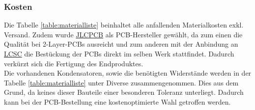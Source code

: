 \documentclass[12pt]{article}
\begin{document}
	\subsubsection{Kosten} \label{Kosten}
	Die Tabelle \ref{table:materialliste} beinhaltet alle anfallenden Materialkosten exkl. Versand. Zudem wurde \href{https://jlcpcb.com/}{JLCPCB} als PCB-Hersteller gewählt, da zum einen die Qualität bei 2-Layer-PCBs ausreicht und zum anderen mit der Anbindung an \href{https://www.lcsc.com/}{LCSC} die Bestückung der PCBs direkt im selben Werk stattfindet. Dadurch verkürzt sich die Fertigung des Endproduktes. \\
	Die vorhandenen Kondensatoren, sowie die benötigten Widerstände werden in der Tabelle \ref{table:materialliste} unter Diverse zusammengenommen. Dies aus dem Grund, da keines dieser Bauteile einer besonderen Toleranz unterliegt. Dadurch kann bei der PCB-Bestellung eine kostenoptimierte Wahl getroffen werden.
\end{document}
